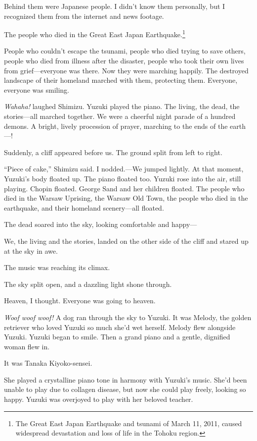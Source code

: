 \documentclass[
    a4paper,
    12pt,
    twoside,
    openany,
    UTF8,
    fontset=windows
]{ctexbook}
\begin{document}
Behind them were Japanese people. I didn't know them personally, but I recognized them from the internet and news footage.

The people who died in the Great East Japan Earthquake.\footnote{The Great East Japan Earthquake and tsunami of March 11, 2011, caused widespread devastation and loss of life in the Tohoku region.}

People who couldn't escape the tsunami, people who died trying to save others, people who died from illness after the disaster, people who took their own lives from grief---everyone was there. Now they were marching happily. The destroyed landscape of their homeland marched with them, protecting them. Everyone, everyone was smiling.

\textit{Wahaha!} laughed Shimizu. Yuzuki played the piano. The living, the dead, the stories---all marched together. We were a cheerful night parade of a hundred demons. A bright, lively procession of prayer, marching to the ends of the earth---!

Suddenly, a cliff appeared before us. The ground split from left to right.

``Piece of cake,'' Shimizu said. I nodded.---We jumped lightly. At that moment, Yuzuki's body floated up. The piano floated too. Yuzuki rose into the air, still playing. Chopin floated. George Sand and her children floated. The people who died in the Warsaw Uprising, the Warsaw Old Town, the people who died in the earthquake, and their homeland scenery---all floated.

The dead soared into the sky, looking comfortable and happy---

We, the living and the stories, landed on the other side of the cliff and stared up at the sky in awe.

The music was reaching its climax.

The sky split open, and a dazzling light shone through.

Heaven, I thought. Everyone was going to heaven.

\textit{Woof woof woof!} A dog ran through the sky to Yuzuki. It was Melody, the golden retriever who loved Yuzuki so much she'd wet herself. Melody flew alongside Yuzuki. Yuzuki began to smile. Then a grand piano and a gentle, dignified woman flew in.

It was Tanaka Kiyoko-sensei.

She played a crystalline piano tone in harmony with Yuzuki's music. She'd been unable to play due to collagen disease, but now she could play freely, looking so happy. Yuzuki was overjoyed to play with her beloved teacher.
\end{document}
